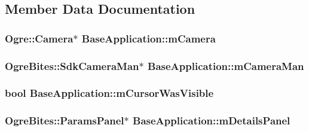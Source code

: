 \subsection{Member Data Documentation}
\hypertarget{class_base_application_a3829c6b12afe911e97e6b4524b33a38b}{
\subsubsection[{m\-Camera}]{\setlength{\rightskip}{0pt plus 5cm}Ogre\-::\-Camera$\ast$ Base\-Application\-::m\-Camera\hspace{0.3cm}{\ttfamily [protected]}}}\label{class_base_application_a3829c6b12afe911e97e6b4524b33a38b}
\hypertarget{class_base_application_a9ae38dea6316058549151fff66a91fcd}{
\subsubsection[{m\-Camera\-Man}]{\setlength{\rightskip}{0pt plus 5cm}Ogre\-Bites\-::\-Sdk\-Camera\-Man$\ast$ Base\-Application\-::m\-Camera\-Man\hspace{0.3cm}{\ttfamily [protected]}}}\label{class_base_application_a9ae38dea6316058549151fff66a91fcd}
\hypertarget{class_base_application_ac7e861799862cb645f1d78b170aef80d}{
\subsubsection[{m\-Cursor\-Was\-Visible}]{\setlength{\rightskip}{0pt plus 5cm}bool Base\-Application\-::m\-Cursor\-Was\-Visible\hspace{0.3cm}{\ttfamily [protected]}}}\label{class_base_application_ac7e861799862cb645f1d78b170aef80d}
\hypertarget{class_base_application_a6a11054ca61efdf558e0ff1b2de43a12}{
\subsubsection[{m\-Details\-Panel}]{\setlength{\rightskip}{0pt plus 5cm}Ogre\-Bites\-::\-Params\-Panel$\ast$ Base\-Application\-::m\-Details\-Panel\hspace{0.3cm}{\ttfamily [protected]}}}\label{class_base_application_a6a11054ca61efdf558e0ff1b2de43a12}
